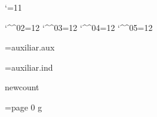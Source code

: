 
\catcode`\@=11

\catcode`\^^02=12 \catcode`\^^03=12 \catcode`\^^04=12 \catcode`\^^05=12


\newread\infile

\newif\ifauxf
\openin\infile=auxiliar.aux
\ifeof\infile \auxffalse \else \auxftrue \fi
\closein\infile

\newif\ifindf
\openin\infile=auxiliar.ind
\ifeof\infile \indffalse \else \indftrue \fi
\closein\infile


\ifx\pdfoutput\undefined \csname newcount\endcsname\pdfoutput \fi


\def\cmykWhite{0 0 0 0} \def\cmykDarkWhite{0 0 0 .3}
\def\cmykGray{0 0 0 .5} \def\cmykDarkGray{0 0 0 .7}
\def\cmykBlack{0 0 0 1} \def\cmykDarkBlack{.4 .3 .3 1}
\def\cmykYellow{0 0 1 0} \def\cmykDarkYellow{0 0 1 .7}
\def\cmykMagenta{0 1 0 0} \def\cmykDarkMagenta{0 1 0 .7}
\def\cmykCyan{1 0 0 0} \def\cmykDarkCyan{1 0 0 .7}
\def\cmykRed{0 1 1 0} \def\cmykDarkRed{0 1 1 .7}
\def\cmykGreen{1 0 1 0} \def\cmykDarkGreen{1 0 1 .7}
\def\cmykBlue{1 1 0 0} \def\cmykDarkBlue{1 1 0 .7}

\newcount\col@rstack
\def\pdf@color#1{\pdfcolorstack\col@rstack push {\csname cmyk#1\endcsname k}}
 \def\pdf@darkcolor#1{\pdfcolorstack\col@rstack push {\csname cmykDark#1\endcsname k}}
 \def\pdf@endcolor{\pdfcolorstack\col@rstack pop}
 \def\pdf@black{\pdfcolorstack\col@rstack push {0 g}}
\def\dvips@color#1{\special{color push cmyk \csname cmyk#1\endcsname}}
 \def\dvips@darkcolor#1{\special{color push cmyk \csname cmykDark#1\endcsname}}
 \def\dvips@endcolor{\special{color pop}}
 \def\dvips@black{\special{color push gray 0}}
\def\dvipdf@color#1{\special{pdf: bc [\csname cmyk#1\endcsname]}}
 \def\dvipdf@darkcolor#1{\special{pdf: bc [\csname cmykDark#1\endcsname]}}
 \def\dvipdf@endcolor{\special{pdf: ec}}
 \def\dvipdf@black{\special{pdf: bc [0]}}

\ifcase\pdfoutput
 \ifx\dvips\undefined
  \let\colorblack=\dvipdf@black
  \def\colors{\let\color=\dvipdf@color\let\truecolor=\dvipdf@color\let\endcolor=\dvipdf@endcolor}
  \def\darkcolors{\let\color=\dvipdf@darkcolor\let\truecolor=\dvipdf@color\let\endcolor=\dvipdf@endcolor}
 \else
  \let\colorblack=\dvips@black
  \def\colors{\let\color=\dvips@color\let\truecolor=\dvips@color\let\endcolor=\dvips@endcolor}
  \def\darkcolors{\let\color=\dvips@darkcolor\let\truecolor=\dvips@color\let\endcolor=\dvips@endcolor}
 \fi
\else
 \col@rstack=\pdfcolorstackinit page {0 g}\let\colorblack=\pdf@black
 \def\colors{\let\color=\pdf@color\let\truecolor=\pdf@color\let\endcolor=\pdf@endcolor}
 \def\darkcolors{\let\color=\pdf@darkcolor\let\truecolor=\pdf@color\let\endcolor=\pdf@endcolor}
\fi

